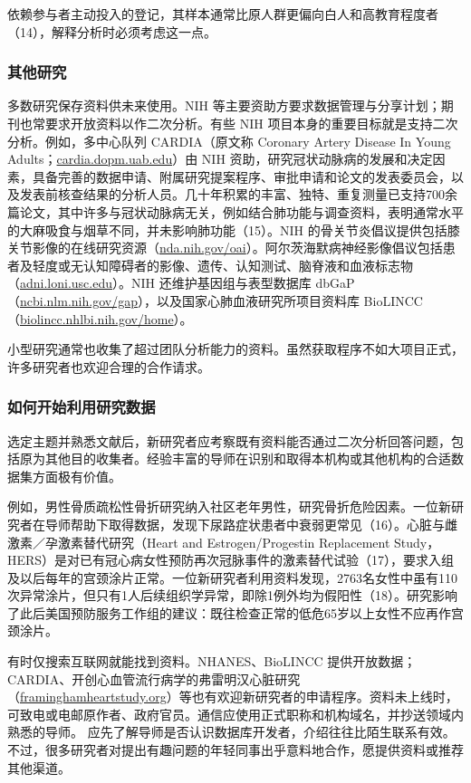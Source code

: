 依赖参与者主动投入的登记，其样本通常比原人群更偏向白人和高教育程度者（14），解释分析时必须考虑这一点。
\subsubsection{其他研究}
多数研究保存资料供未来使用。NIH 等主要资助方要求数据管理与分享计划；期刊也常要求开放资料以作二次分析。有些 NIH 项目本身的重要目标就是支持二次分析。例如，多中心队列 CARDIA（原文称 Coronary Artery Disease In Young Adults；\url{cardia.dopm.uab.edu}）由 NIH 资助，研究冠状动脉病的发展和决定因素，具备完善的数据申请、附属研究提案程序、审批申请和论文的发表委员会，以及发表前核查结果的分析人员。几十年积累的丰富、独特、重复测量已支持700余篇论文，其中许多与冠状动脉病无关，例如结合肺功能与调查资料，表明通常水平的大麻吸食与烟草不同，并未影响肺功能（15）。NIH 的骨关节炎倡议提供包括膝关节影像的在线研究资源（\url{nda.nih.gov/oai}）。阿尔茨海默病神经影像倡议包括患者及轻度或无认知障碍者的影像、遗传、认知测试、脑脊液和血液标志物（\url{adni.loni.usc.edu}）。NIH 还维护基因组与表型数据库 dbGaP（\url{ncbi.nlm.nih.gov/gap}），以及国家心肺血液研究所项目资料库 BioLINCC（\url{biolincc.nhlbi.nih.gov/home}）。

小型研究通常也收集了超过团队分析能力的资料。虽然获取程序不如大项目正式，许多研究者也欢迎合理的合作请求。
\subsubsection{如何开始利用研究数据}
选定主题并熟悉文献后，新研究者应考察既有资料能否通过二次分析回答问题，包括原为其他目的收集者。经验丰富的导师在识别和取得本机构或其他机构的合适数据集方面极有价值。

例如，男性骨质疏松性骨折研究纳入社区老年男性，研究骨折危险因素。一位新研究者在导师帮助下取得数据，发现下尿路症状患者中衰弱更常见（16）。心脏与雌激素／孕激素替代研究（Heart and Estrogen/Progestin Replacement Study，HERS）是对已有冠心病女性预防再次冠脉事件的激素替代试验（17），要求入组及以后每年的宫颈涂片正常。一位新研究者利用资料发现，2763名女性中虽有110次异常涂片，但只有1人后续组织学异常，即除1例外均为假阳性（18）。研究影响了此后美国预防服务工作组的建议：既往检查正常的低危65岁以上女性不应再作宫颈涂片。

有时仅搜索互联网就能找到资料。NHANES、BioLINCC 提供开放数据；CARDIA、开创心血管流行病学的弗雷明汉心脏研究（\url{framinghamheartstudy.org}）等也有欢迎新研究者的申请程序。资料未上线时，可致电或电邮原作者、政府官员。通信应使用正式职称和机构域名，并抄送领域内熟悉的导师。
应先了解导师是否认识数据库开发者，介绍往往比陌生联系有效。不过，很多研究者对提出有趣问题的年轻同事出乎意料地合作，愿提供资料或推荐其他渠道。

